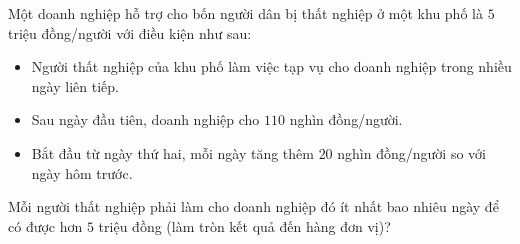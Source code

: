 \begin{ex}
Một doanh nghiệp hỗ trợ cho bốn người dân bị thất nghiệp ở một khu phố là $5$ triệu đồng/người với điều kiện như sau:
\begin{itemize}[leftmargin=1.5em,nosep]
  \item Người thất nghiệp của khu phố làm việc tạp vụ cho doanh nghiệp trong nhiều ngày liên tiếp.
  \item Sau ngày đầu tiên, doanh nghiệp cho $110$ nghìn đồng/người.
  \item Bắt đầu từ ngày thứ hai, mỗi ngày tăng thêm $20$ nghìn đồng/người so với ngày hôm trước.
\end{itemize}
Mỗi người thất nghiệp phải làm cho doanh nghiệp đó ít nhất bao nhiêu ngày để có được hơn $5$ triệu đồng (làm tròn kết quả đến hàng đơn vị)?
\end{ex}
